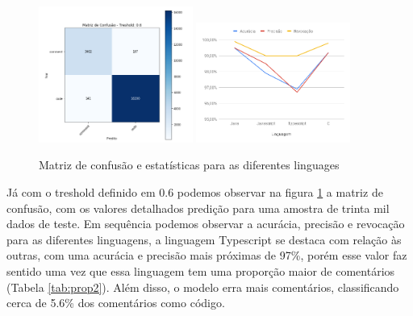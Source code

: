 \documentclass[12pt]{article}
\begin{document}
\begin{figure}[ht]
  \centering
  \includegraphics[width=0.45\textwidth]{../images/confmat.png}
  \includegraphics[width=0.45\textwidth]{../images/chart-ling.png}
  \caption{Matriz de confusão e estatísticas para as diferentes linguages }
  \label{fig:confmat}
\end{figure}


Já com o treshold definido em 0.6 podemos observar na figura \ref{fig:confmat} a  matriz de 
confusão, com os valores detalhados predição para uma amostra de trinta mil dados de teste.
Em sequência podemos observar a acurácia, precisão e revocação para as diferentes linguagens,
a linguagem Typescript se destaca com relação às outras, com uma acurácia e precisão mais próximas
de 97\%, porém esse valor faz sentido uma vez que essa linguagem tem uma proporção maior de 
comentários (Tabela \ref{tab:prop2}). Além disso, o modelo erra mais comentários, classificando
cerca de 5.6\% dos comentários como código.
\end{document}
